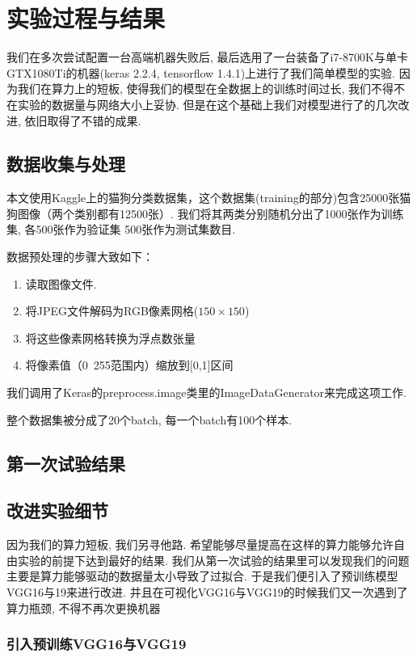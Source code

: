 \documentclass[lang=cn,11pt]{elegantpaper}
\begin{document}
\section{实验过程与结果}

我们在多次尝试配置一台高端机器失败后, 最后选用了一台装备了i7-8700K与单卡GTX1080Ti的机器(keras 2.2.4, tensorflow 1.4.1)上进行了我们简单模型的实验. 因为我们在算力上的短板, 使得我们的模型在全数据上的训练时间过长, 我们不得不在实验的数据量与网络大小上妥协. 但是在这个基础上我们对模型进行了的几次改进, 依旧取得了不错的成果.

\subsection{数据收集与处理}
本文使用Kaggle上的猫狗分类数据集，这个数据集(training的部分)包含25000张猫狗图像（两个类别都有12500张）. 我们将其两类分别随机分出了1000张作为训练集, 各500张作为验证集 500张作为测试集数目.

  数据预处理的步骤大致如下：

\begin{enumerate}
	\item 读取图像文件.
	\item 将JPEG文件解码为RGB像素网格($150\times 150$)
	\item 将这些像素网格转换为浮点数张量
	\item 将像素值（0~255范围内）缩放到[0,1]区间
\end{enumerate}

我们调用了Keras的preprocess.image类里的ImageDataGenerator来完成这项工作.

整个数据集被分成了20个batch, 每一个batch有100个样本.

\subsection{第一次试验结果}


\subsection{改进实验细节}

因为我们的算力短板, 我们另寻他路. 希望能够尽量提高在这样的算力能够允许自由实验的前提下达到最好的结果. 我们从第一次试验的结果里可以发现我们的问题主要是算力能够驱动的数据量太小导致了过拟合. 于是我们便引入了预训练模型VGG16与19来进行改进. 并且在可视化VGG16与VGG19的时候我们又一次遇到了算力瓶颈, 不得不再次更换机器


\subsubsection{引入预训练VGG16与VGG19}
\end{document}

